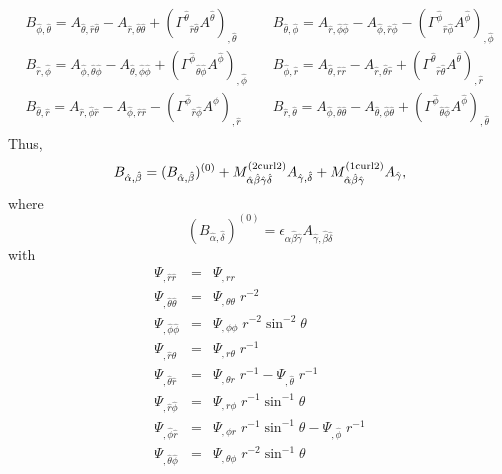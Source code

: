 \documentclass[\mydriver,12pt,twoside,notitlepage,a4paper]{article}
\begin{document}
\begin{eqnarray}
\begin{array}{lll}
B_{\hat\phi,\hat\theta}=
A_{\hat\theta,\hat r\hat\theta}-A_{\hat r,\hat\theta\hat\theta}+({\Gamma^{\hat\theta}}_{\hat r\hat\theta}A^{\hat\theta})_{,\hat\theta}
\quad&
B_{\hat\theta,\hat\phi}=
A_{\hat r,\hat\phi\hat\phi}-A_{\hat\phi,\hat r\hat\phi}-({\Gamma^{\hat\phi}}_{\hat r\hat\phi}A^{\hat\phi})_{,\hat\phi}
\\
B_{\hat r,\hat\phi}=
A_{\hat\phi,\hat\theta\hat\phi}-A_{\hat\theta,\hat\phi\hat\phi}+({\Gamma^{\hat\phi}}_{\hat\theta\hat\phi}A^{\hat\phi})_{,\hat\phi}
\quad&
B_{\hat\phi,\hat r}=
A_{\hat\theta,\hat r\hat r}-A_{\hat r,\hat\theta\hat r}+({\Gamma^{\hat\theta}}_{\hat r\hat\theta}A^{\hat\theta})_{,\hat r}
\\
B_{\hat\theta,\hat r}=
A_{\hat r,\hat\phi\hat r}-A_{\hat\phi,\hat r\hat r}-({\Gamma^{\hat\phi}}_{\hat r\hat\phi}A^{\hat\phi})_{,\hat r}
\quad&
B_{\hat r,\hat\theta}=
A_{\hat\phi,\hat\theta\hat\theta}-A_{\hat\theta,\hat\phi\hat\theta}+({\Gamma^{\hat\phi}}_{\hat\theta\hat\phi}A^{\hat\phi})_{,\hat\theta}
\end{array}
\end{eqnarray}
Thus,
\begin{equation}
B_{\hat\alpha,\hat\beta}
=(B_{\hat\alpha,\hat\beta})^{(0)}
+M^{\rm(2curl2)}_{\hat\alpha\hat\beta\hat\gamma\hat\delta}
A_{\hat\gamma,\hat\delta}
+M^{\rm(1curl2)}_{\hat\alpha\hat\beta\hat\gamma}A_{\hat\gamma},
\end{equation}
where
\begin{equation}
(B_{\hat\alpha,\hat\delta})^{(0)}
=\epsilon_{\hat\alpha\hat\beta\hat\gamma}A_{\hat\gamma,\hat\beta\hat\delta}
\end{equation}
with
\begin{eqnarray}
\Psi_{,\hat r\hat r}&=&\Psi_{,rr}
\\
\Psi_{,\hat\theta\hat\theta}&=&\Psi_{,\theta\theta}\;r^{-2}
\\
\Psi_{,\hat\phi\hat\phi}&=&\Psi_{,\phi\phi}\;r^{-2}\sin^{-2}\!\theta
\\
\Psi_{,\hat r\hat\theta}&=&\Psi_{,r\theta}\;r^{-1}
\\
\Psi_{,\hat\theta\hat r}&=&\Psi_{,\theta r}\;r^{-1}
-\Psi_{,\hat\theta}\;r^{-1}
\\
\Psi_{,\hat r\hat\phi}&=&\Psi_{,r\phi}\;r^{-1}\sin^{-1}\!\theta
\\
\Psi_{,\hat\phi\hat r}&=&\Psi_{,\phi r}\;r^{-1}\sin^{-1}\!\theta
-\Psi_{,\hat\phi}\;r^{-1}
\\
\Psi_{,\hat\theta\hat\phi}&=&\Psi_{,\theta\phi}\;r^{-2}\sin^{-1}\!\theta
\end{eqnarray}
\end{document}
